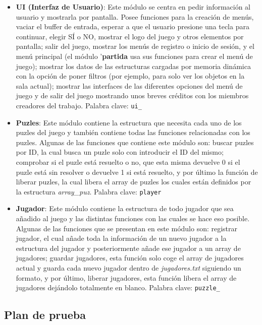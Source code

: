 \begin{itemize}
	\item \textbf{UI (Interfaz de Usuario)}: Este módulo se centra en pedir información al usuario y mostrarla por pantalla. 
	Posee funciones para la creación de menús, vaciar el buffer de entrada, esperar a que el usuario presione una tecla para continuar, 
	elegir SÍ o NO, mostrar el logo del juego y otros elementos por pantalla; salir del juego, mostrar los menús de registro o inicio de sesión,
	 y el menú principal (el módulo '\textbf{partida} usa sus funciones para crear el menú de juego); mostrar los datos de las 
	 estructuras cargadas por memoria dinámica con la opción de poner filtros (por ejemplo, para solo ver los objetos en la sala actual); 
	 mostrar las interfaces de las diferentes opciones del menú de juego y de salir del juego mostrando unos breves créditos con los 
	 miembros creadores del trabajo. Palabra clave: \texttt{ui\_}
	\item \textbf{Puzles}: Este módulo contiene la estructura que necesita cada uno de los puzles del juego y también contiene 
	todas las funciones relacionadas con los puzles. Algunas de las funciones que contiene este módulo son: buscar puzles por ID,
	 la cual busca un puzle solo con introducir el ID del mismo; comprobar si el puzle está resuelto o no, que esta misma devuelve
	  0 si el puzle está sin resolver o devuelve 1 si está resuelto, y por último la función de liberar puzles, la cual libera el 
	  array de puzles los cuales están definidos por la estructura \textit{array\_puz}. Palabra clave: \texttt{player}

	\item \textbf{Jugador}: Este módulo contiene la estructura de todo jugador que sea añadido al juego y las distintas funciones con las
	 cuales se hace eso posible. Algunas de las funciones que se presentan en este módulo son: registrar jugador, el cual añade toda la información de un 
	 nuevo jugador a la estructura del jugador y posteriormente añade ese jugador a un array de jugadores; guardar jugadores, esta función solo coge el
	  array de jugadores actual y guarda cada nuevo jugador dentro de \textit{jugadores.txt} siguiendo un formato, y por último, liberar jugadores, esta 
	  función libera el array de jugadores dejándolo totalmente en blanco. Palabra clave: \texttt{puzzle\_}
\end{itemize}

\bigskip


\subsection{Plan de prueba}



